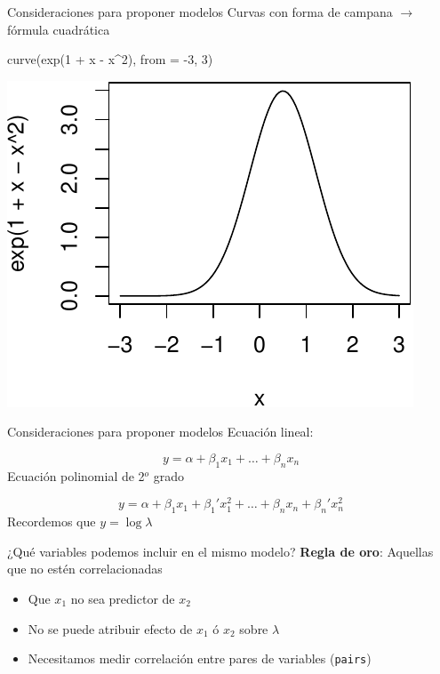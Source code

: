 \documentclass[
  11pt,
  ignorenonframetext,
]{beamer}
\newenvironment{Shaded}{}{}
\newcommand{\AttributeTok}[1]{\textcolor[rgb]{0.49,0.56,0.16}{#1}}
\newcommand{\DecValTok}[1]{\textcolor[rgb]{0.25,0.63,0.44}{#1}}
\newcommand{\FunctionTok}[1]{\textcolor[rgb]{0.02,0.16,0.49}{#1}}
\newcommand{\NormalTok}[1]{#1}
\newcommand{\SpecialCharTok}[1]{\textcolor[rgb]{0.25,0.44,0.63}{#1}}
\providecommand{\tightlist}{%
  \setlength{\itemsep}{0pt}\setlength{\parskip}{0pt}}
\begin{document}
\begin{frame}[fragile]{Consideraciones para proponer modelos}
\protect\hypertarget{consideraciones-para-proponer-modelos}{}
Curvas con forma de campana \(\rightarrow\) fórmula cuadrática

\begin{Shaded}
\begin{Highlighting}[]
\FunctionTok{curve}\NormalTok{(}\FunctionTok{exp}\NormalTok{(}\DecValTok{1} \SpecialCharTok{+}\NormalTok{ x }\SpecialCharTok{{-}}\NormalTok{ x}\SpecialCharTok{\^{}}\DecValTok{2}\NormalTok{), }\AttributeTok{from =} \SpecialCharTok{{-}}\DecValTok{3}\NormalTok{, }\DecValTok{3}\NormalTok{)}
\end{Highlighting}
\end{Shaded}

\includegraphics{Tutorial-spatstat-2_files/figure-beamer/unnamed-chunk-12-1.pdf}
\end{frame}

\begin{frame}{Consideraciones para proponer modelos}
\protect\hypertarget{consideraciones-para-proponer-modelos-1}{}
Ecuación lineal:

\[ y = \alpha + \beta_1 x_1 + \dots + \beta_n x_n\] Ecuación polinomial
de 2\(^o\) grado

\[ y = \alpha + \beta_1 x_1 + \beta_1' x_1^2 + \dots + \beta_n x_n + \beta_n' x_n^2\]
Recordemos que \(y = \log \lambda\)
\end{frame}

\begin{frame}[fragile]{¿Qué variables podemos incluir en el mismo
modelo?}
\protect\hypertarget{quuxe9-variables-podemos-incluir-en-el-mismo-modelo}{}
\textbf{Regla de oro}: Aquellas que no estén correlacionadas

\begin{itemize}
\tightlist
\item
  Que \(x_1\) no sea predictor de \(x_2\)
\item
  No se puede atribuir efecto de \(x_1\) ó \(x_2\) sobre \(\lambda\)
\item
  Necesitamos medir correlación entre pares de variables
  (\texttt{pairs})
\end{itemize}
\end{frame}
\end{document}
